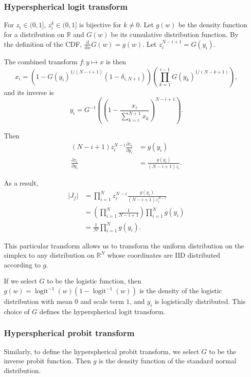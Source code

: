 \begin{appendices}
\subsubsection{Hyperspherical logit transform}

For $z_i \in (0, 1]$, $z_i^k \in (0, 1]$ is bijective for $k \ne 0$.
Let $g(w)$ be the density function for a distribution on $\mathbb{R}$ and $G(w)$ be its cumulative distribution function.
By the definition of the CDF, $\frac{\mathrm{d}}{\mathrm{d}w} G(w) = g(w)$.
Let $z_i^{N-i+1} = G(y_i)$.

The combined transform $f: y \mapsto x$ is then
\[
  x_i = \left(1-G(y_i)^{1/(N-i+1)}(1 - \delta_{i,N+1})\right)\left(\prod_{k=1}^{i-1} G(y_k)^{1/(N-k+1)}\right),
\]
and its inverse is 
\[
y_i = G^{-1}\left(\left(1 - \frac{x_i}{\sum_{k=i}^{N+1} x_k}\right)^{N-i+1}\right).
\]

Then
$$
\begin{aligned}
(N-i+1) z_i^{N-i} \frac{\partial z_i}{\partial y_i} &= g(y_i)\\
\frac{\partial z_i}{\partial y_i} &= \frac{g(y_i)}{(N-i+1) z_i}.
\end{aligned}
$$

As a result,
$$
\begin{aligned}
|J_f| &= \prod_{i=1}^{N} z_i^{N-i} \frac{g(y_i)}{(N-i+1) z_i^{N-i}}\\ 
&= \left(\prod_{i=1}^N \frac{1}{N-i+1} \right) \prod_{i=1}^{N} g(y_i)\\
&= \frac{1}{N!} \prod_{i=1}^{N} g(y_i).
\end{aligned}
$$

This particular transform allows us to transform the uniform distribution on the simplex to any distribution on $\mathbb{R}^N$ whose coordinates are IID distributed according to $g$.

If we select $G$ to be the logistic function, then $g(w) = \operatorname{logit}^{-1}(w) (1 - \operatorname{logit}^{-1}(w))$ is the density of the logistic distribution with mean $0$ and scale term $1$, and $y_i$ is logistically distributed.
This choice of $G$ defines the hyperspherical logit transform.

\subsubsection{Hyperspherical probit transform}

Similarly, to define the hyperspherical probit transform, we select $G$ to be the inverse probit function.
Then $g$ is the density function of the standard normal distribution.


\end{appendices}
